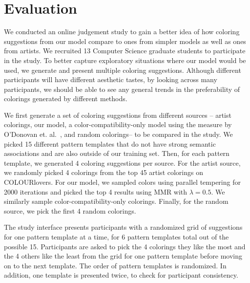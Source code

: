 \section{Evaluation}
\label{sec:evaluation}


We conducted an online judgement study to gain a better idea of how coloring suggestions from our model compare to ones from simpler models as well as ones from artists. We recruited 13 Computer Science graduate students to participate in the study. To better capture exploratory situations where our model would be used, we generate and present multiple coloring suggestions. Although different participants will have different aesthetic tastes, by looking across many participants, we should be able to see any general trends in the preferability of colorings generated by different methods. 

We first generate a set of coloring suggestions from different sources -- artist colorings, our model, a color-compatibility-only model using the measure by O'Donovan et. al.~, and random colorings-- to be compared in the study. We picked 15 different pattern templates that do not have strong semantic associations and are also outside of our training set. Then, for each pattern template, we generated 4 coloring suggestions per source. For the artist source, we randomly picked 4 colorings from the top 45 artist colorings on COLOURlovers. For our model, we sampled colors using parallel tempering for 2000 iterations and picked the top 4 results using MMR with $\lambda = 0.5$. We similarly sample color-compatibility-only colorings. Finally, for the random source, we pick the first 4 random colorings.

The study interface presents participants with a randomized grid of suggestions for one pattern template at a time, for 6 pattern templates total out of the possible 15. Participants are asked to pick the 4 colorings they like the most and the 4 others like the least from the grid for one pattern template before moving on to the next template. The order of pattern templates is randomized. In addition, one template is presented twice, to check for participant consistency. 


